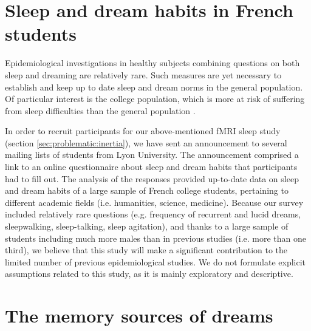 \section{Sleep and dream habits in French students}
\label{sec:problematic:survey}

Epidemiological investigations in healthy subjects combining questions on both sleep and dreaming are relatively rare. Such measures are yet necessary to establish and keep up to date sleep and dream norms in the general population. Of particular interest is the college population, which is more at risk of suffering from sleep difficulties than the general population \citep{buboltz_sleep_2001, curcio_sleep_2006, forquer_sleep_2008, lund_sleep_2010}.

In order to recruit participants for our above-mentioned fMRI sleep study (section \ref{sec:problematic:inertia}), we have sent an announcement to several mailing lists of students from Lyon University. The announcement comprised a link to an online questionnaire about sleep and dream habits that participants had to fill out. The analysis of the responses provided up-to-date data on sleep and dream habits of a large sample of French college students, pertaining to different academic fields (i.e. humanities, science, medicine). Because our survey included relatively rare questions (e.g. frequency of recurrent and lucid dreams, sleepwalking, sleep-talking, sleep agitation), and thanks to a large sample of students including much more males than in previous studies (i.e. more than one third), we believe that this study will make a significant contribution to the limited number of previous epidemiological studies. We do not formulate explicit assumptions related to this study, as it is mainly exploratory and descriptive.

\section{The memory sources of dreams}
\label{sec:problematic:wle}

